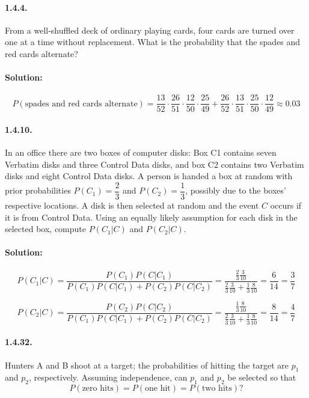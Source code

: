 \documentclass[12pt,a4paper]{article}
\begin{document}
\paragraph{1.4.4.} From a well-shuffled deck of ordinary playing cards, four cards are turned over one at a time without replacement. What is the probability that the spades and red cards alternate?

\paragraph{Solution:}
	\[
		P(\textrm{spades and red cards alternate}) = \frac{13}{52}\cdot\frac{26}{51}\cdot\frac{12}{50}\cdot\frac{25}{49}  + \frac{26}{52}\cdot\frac{13}{51}\cdot\frac{25}{50}\cdot\frac{12}{49} \approx 0.03 
	\] 
	
\paragraph{1.4.10.} In an office there are two boxes of computer disks: Box C1 contains seven
Verbatim disks and three Control Data disks, and box C2 contains two Verbatim disks and eight Control Data disks. A person is handed a box at random with prior probabilities $P(C_{1}) = \dfrac{2}{3}$ and $P(C_{2}) = \dfrac{1}{3}$, possibly due to the boxes’ respective locations. A disk is then selected at random and the event $C$ occurs if it is from Control Data. Using an equally likely assumption for each disk in the selected box, compute $P(C_{1}|C)$ and $P(C_{2}|C)$.

\paragraph{Solution:}
	\[
		P(C_{1}|C) = \frac{P(C_{1})P(C|C_{1})}{P(C_{1})P(C|C_{1}) + P(C_{2})P(C|C_{2})} = \frac{\frac{2}{3}\frac{3}{10}}{\frac{2}{3}\frac{3}{10} + \frac{1}{3}\frac{8}{10}} = \frac{6}{14} = \frac{3}{7}
	\]

	\[
		P(C_{2}|C) = \frac{P(C_{2})P(C|C_{2})}{P(C_{1})P(C|C_{1}) + P(C_{2})P(C|C_{2})} = \frac{\frac{1}{3}\frac{8}{10}}{\frac{2}{3}\frac{3}{10} + \frac{1}{3}\frac{8}{10}} = \frac{8}{14} = \frac{4}{7}
	\] 
	
\paragraph{1.4.32.} Hunters A and B shoot at a target; the probabilities of hitting the target
are $p_{1}$ and $p_{2}$, respectively. Assuming independence, can $p_{1}$ and $p_{2}$ be selected so that
	\[
		P(\textrm{zero hits}) = P(\textrm{one hit}) = P(\textrm{two hits})?
	\]
\end{document}

